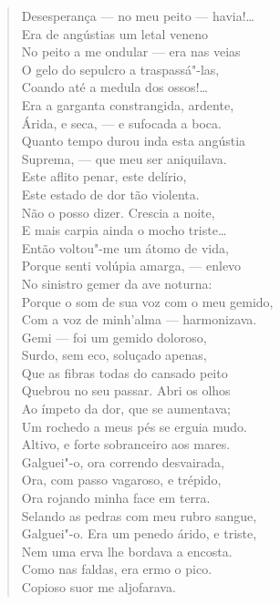 \begin{verse}
Desesperança --- no meu peito --- havia!\ldots{}\\
Era de angústias um letal veneno\\
No peito a me ondular --- era nas veias\\
O gelo do sepulcro a traspassá"-las,\\
Coando até a medula dos ossos!\ldots{}\\
Era a garganta constrangida, ardente,\\
Árida, e seca, --- e sufocada a boca.\\
Quanto tempo durou inda esta angústia\\
Suprema, --- que meu ser aniquilava.\\
Este aflito penar, este delírio,\\
Este estado de dor tão violenta.\\
Não o posso dizer. Crescia a noite,\\
E mais carpia ainda o mocho triste\ldots{}\\
Então voltou"-me um átomo de vida,\\
Porque senti volúpia amarga, --- enlevo\\
No sinistro gemer da ave noturna:\\
Porque o som de sua voz com o meu gemido,\\
Com a voz de minh'alma --- harmonizava.\\
Gemi --- foi um gemido doloroso,\\
Surdo, sem eco, soluçado apenas,\\
Que as fibras todas do cansado peito\\
Quebrou no seu passar. Abri os olhos\\
Ao ímpeto da dor, que se aumentava;\\
Um rochedo a meus pés se erguia mudo.\\
Altivo, e forte sobranceiro aos mares.\\
Galguei"-o, ora correndo desvairada,\\
Ora, com passo vagaroso, e trépido,\\
Ora rojando minha face em terra.\\
Selando as pedras com meu rubro sangue,\\
Galguei"-o. Era um penedo árido, e triste,\\
Nem uma erva lhe bordava a encosta.\\
Como nas faldas, era ermo o pico.\\
Copioso suor me aljofarava.\\

\end{verse}
